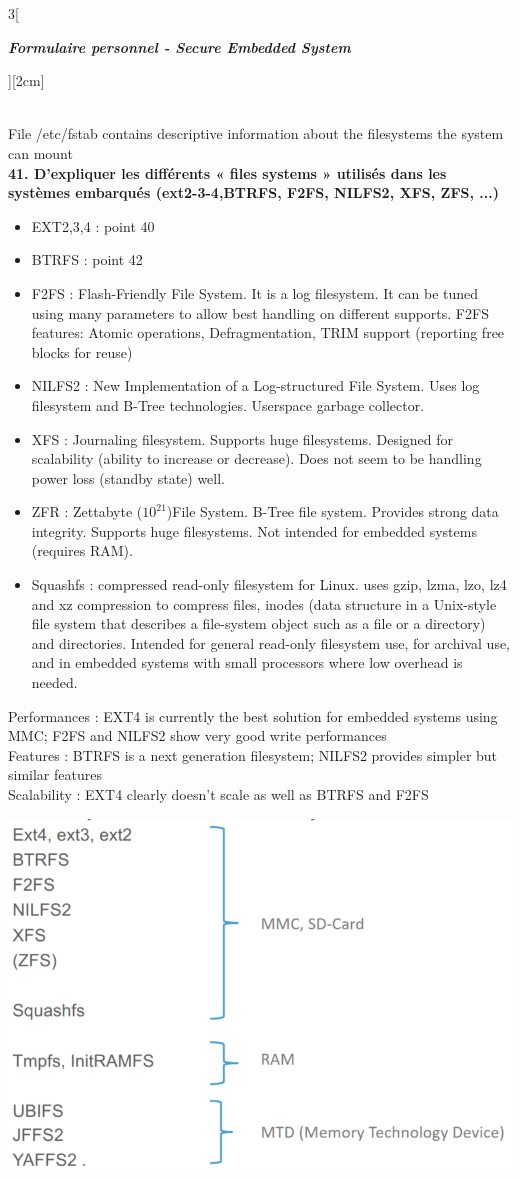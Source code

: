 \begin{multicols}{3}[\centerline{ \large\em \textbf{Formulaire personnel - Secure Embedded System}}][2cm]
\begin{minipage}{\linewidth}
\end{minipage}\\
File /etc/fstab contains descriptive information about the filesystems the
system can mount
\\ \textbf{41. D’expliquer les différents « files systems » utilisés dans les systèmes embarqués (ext2-3-4,BTRFS, F2FS, NILFS2, XFS, ZFS, ...)}~
\begin{itemize}
\item EXT2,3,4 : point 40
\item BTRFS : point 42
\item F2FS : Flash-Friendly File System. It is a log filesystem. It can be tuned using many parameters to allow best handling on different supports. F2FS features: Atomic operations, Defragmentation, TRIM support (reporting free blocks for reuse)
\item NILFS2 : New Implementation of a Log-structured File System. Uses log filesystem and B-Tree technologies. Userspace garbage collector.
\item XFS : Journaling filesystem. Supports huge filesystems. Designed for scalability (ability to increase or decrease). Does not seem to be handling power loss (standby state) well.
\item ZFR : Zettabyte ($10^{21}$)File System. B-Tree file system. Provides strong data integrity. Supports huge filesystems. Not intended for embedded systems (requires RAM).
\item Squashfs : compressed read-only filesystem for Linux.  uses gzip, lzma, lzo, lz4 and xz compression to compress files, inodes (data structure in a Unix-style file system that describes a file-system object such as a file or a directory) and directories. Intended for general read-only filesystem use, for archival use, and in embedded systems with small processors where low overhead is needed.
\end{itemize}
Performances : EXT4 is currently the best solution for embedded systems using MMC; F2FS and NILFS2 show very good write performances\\
Features : BTRFS is a next generation filesystem; NILFS2 provides simpler but similar features\\
Scalability : EXT4 clearly doesn’t scale as well as BTRFS and F2FS\\
\begin{minipage}{\linewidth}
	\centering
    \includegraphics[width =0.5\columnwidth]{images/28.png}

\end{minipage}
\end{multicols}
